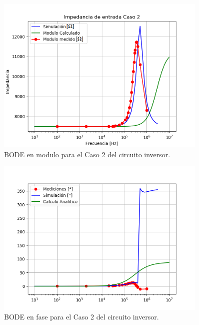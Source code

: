 \begin{figure}[H]	
	\centering
	\includegraphics[width=0.9\textwidth]{Ejercicio1/Imagenes/CZinC2.png}
	\caption{BODE en modulo para el Caso 2 del circuito inversor.}
	\label{fig:CompZinC2inv}
\end{figure} 

\begin{figure}[H]	
	\centering
	\includegraphics[width=0.9\textwidth]{Ejercicio1/Imagenes/ZinphC2.png}
	\caption{BODE en fase para el Caso 2 del circuito inversor.}
	\label{fig:CompZinphC2inv}
\end{figure} 

